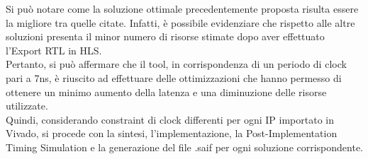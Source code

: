 Si può notare come la soluzione ottimale precedentemente proposta risulta essere la migliore tra quelle citate. Infatti, è possibile evidenziare che rispetto alle altre soluzioni presenta il minor numero di risorse stimate dopo aver effettuato l'Export RTL in HLS. 
\\
Pertanto, si può affermare che il tool, in corrispondenza di un periodo di clock pari a 7ns, è riuscito ad effettuare delle ottimizzazioni che hanno permesso di ottenere un minimo aumento della latenza e una diminuzione delle risorse utilizzate.
\\
Quindi, considerando constraint di clock differenti per ogni IP importato in Vivado, si procede con la sintesi, l'implementazione, la Post-Implementation Timing Simulation e la generazione del file .saif per ogni soluzione corrispondente.









